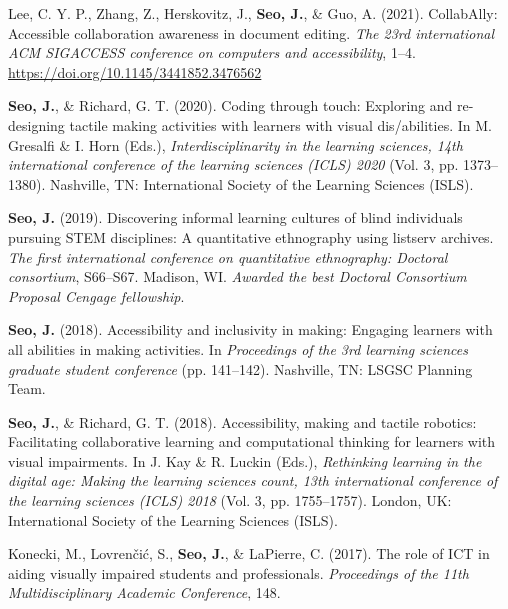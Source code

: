 \documentclass[11pt,a4paper,]{awesome-cv}
\begin{document}
\hypertarget{refs_proceedings}{}
\leavevmode{}%
Lee, C. Y. P., Zhang, Z., Herskovitz, J., \textbf{Seo, J.}, \& Guo, A.
(2021). CollabAlly: Accessible collaboration awareness in document
editing. \emph{The 23rd international ACM SIGACCESS conference on
    computers and accessibility}, 1--4.
\url{https://doi.org/10.1145/3441852.3476562}

\leavevmode{}%
\textbf{Seo, J.}, \& Richard, G. T. (2020). Coding through touch:
Exploring and re-designing tactile making activities with learners with
visual dis/abilities. In M. Gresalfi \& I. Horn (Eds.),
\emph{Interdisciplinarity in the learning sciences, 14th international
    conference of the learning sciences (ICLS) 2020} (Vol. 3, pp.
1373--1380). Nashville, TN: International Society of the Learning
Sciences (ISLS).

\leavevmode{}%
\textbf{Seo, J.} (2019). Discovering informal learning cultures of blind
individuals pursuing STEM disciplines: A quantitative ethnography using
listserv archives. \emph{The first international conference on
    quantitative ethnography: Doctoral consortium}, S66--S67. Madison, WI.
\emph{Awarded the best Doctoral Consortium Proposal Cengage fellowship}.

\leavevmode{}%
\textbf{Seo, J.} (2018). Accessibility and inclusivity in making:
Engaging learners with all abilities in making activities. In
\emph{Proceedings of the 3rd learning sciences graduate student
    conference} (pp. 141--142). Nashville, TN: LSGSC Planning Team.

\leavevmode{}%
\textbf{Seo, J.}, \& Richard, G. T. (2018). Accessibility, making and
tactile robotics: Facilitating collaborative learning and computational
thinking for learners with visual impairments. In J. Kay \& R. Luckin
(Eds.), \emph{Rethinking learning in the digital age: Making the
    learning sciences count, 13th international conference of the learning
    sciences (ICLS) 2018} (Vol. 3, pp. 1755--1757). London, UK:
International Society of the Learning Sciences (ISLS).

\leavevmode{}%
Konecki, M., Lovrenčić, S., \textbf{Seo, J.}, \& LaPierre, C. (2017).
The role of ICT in aiding visually impaired students and professionals.
\emph{Proceedings of the 11th Multidisciplinary Academic Conference},
148.
\end{document}
